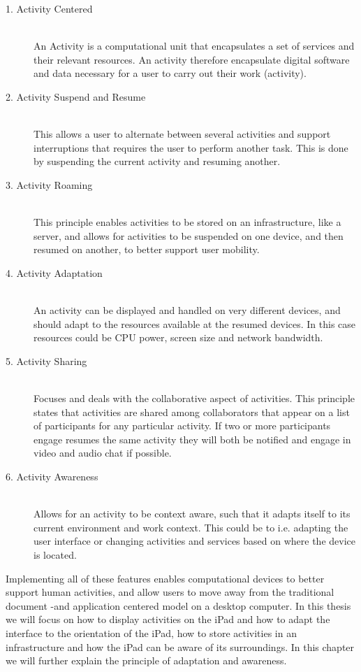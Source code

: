 \begin{description}

	\item[1. Activity Centered] \hfill \\
	An Activity is a computational unit that encapsulates a set of services and their relevant resources. An activity therefore encapsulate digital software and data necessary for a user to carry out their work (activity).
	
	\item[2. Activity Suspend and Resume] \hfill \\
	This allows a user to alternate between several activities and support interruptions that requires the user to perform another task. This is done by suspending the current activity and resuming another.
	
	\item[3. Activity Roaming] \hfill \\
	This principle enables activities to be stored on an infrastructure, like a server, and allows for activities to be suspended on one device, and then resumed on another, to better support user mobility.
	
	\item[4. Activity Adaptation] \hfill \\
	An activity can be displayed and handled on very different devices, and should adapt to the resources available at the resumed devices. In this case resources could be CPU power, screen size and network bandwidth.
	
	\item[5. Activity Sharing] \hfill \\
	Focuses and deals with the collaborative aspect of activities. This principle states that activities are shared among collaborators that appear on a list of participants for any particular activity. If two or more participants engage resumes the same activity they will both be notified and engage in video and audio chat if possible.
		
	\item[6. Activity Awareness] \hfill \\
	Allows for an activity to be context aware, such that it adapts itself to its current environment and work context. This could be to i.e. adapting the user interface or changing activities and services based on where the device is located.

\end{description}

Implementing all of these features enables computational devices to better support human activities, and allow users to move away from the traditional document -and application centered model on a desktop computer. In this thesis we will focus on how to display activities on the iPad and how to adapt the interface to the orientation of the iPad, how to store activities in an infrastructure and how the iPad can be aware of its surroundings. In this chapter we will further explain the principle of adaptation and awareness.

